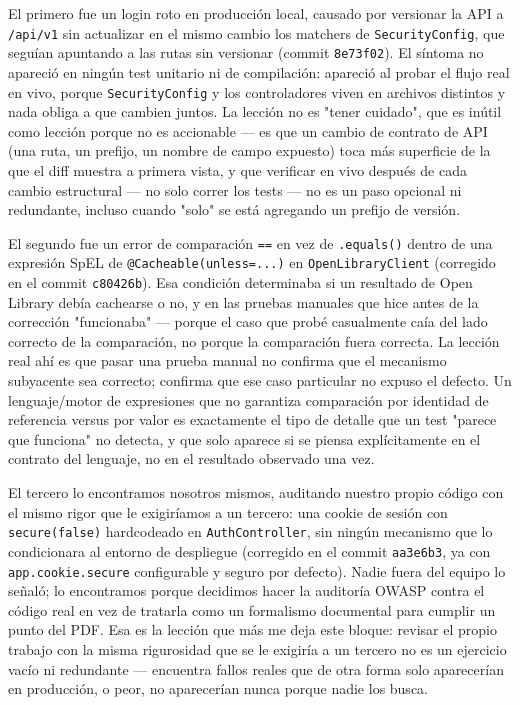 \documentclass[12pt,a4paper]{article}
\begin{document}
El primero fue un login roto en producción local, causado por versionar la API a
\texttt{/api/v1} sin actualizar en el mismo cambio los matchers de
\texttt{SecurityConfig}, que seguían apuntando a las rutas sin versionar (commit
\texttt{8e73f02}). El síntoma no apareció en ningún test unitario ni de compilación:
apareció al probar el flujo real en vivo, porque \texttt{SecurityConfig} y los
controladores viven en archivos distintos y nada obliga a que cambien juntos. La
lección no es "tener cuidado", que es inútil como lección porque no es accionable — es
que un cambio de contrato de API (una ruta, un prefijo, un nombre de campo expuesto)
toca más superficie de la que el diff muestra a primera vista, y que verificar en vivo
después de cada cambio estructural — no solo correr los tests — no es un paso opcional
ni redundante, incluso cuando "solo" se está agregando un prefijo de versión.

El segundo fue un error de comparación \texttt{==} en vez de \texttt{.equals()} dentro
de una expresión SpEL de \texttt{@Cacheable(unless=...)} en \texttt{OpenLibraryClient}
(corregido en el commit \texttt{c80426b}). Esa condición determinaba si un resultado de
Open Library debía cachearse o no, y en las pruebas manuales que hice antes de la
corrección "funcionaba" — porque el caso que probé casualmente caía del lado correcto
de la comparación, no porque la comparación fuera correcta. La lección real ahí es que
pasar una prueba manual no confirma que el mecanismo subyacente sea correcto; confirma
que ese caso particular no expuso el defecto. Un lenguaje/motor de expresiones que no
garantiza comparación por identidad de referencia versus por valor es exactamente el
tipo de detalle que un test "parece que funciona" no detecta, y que solo aparece si se
piensa explícitamente en el contrato del lenguaje, no en el resultado observado una vez.

El tercero lo encontramos nosotros mismos, auditando nuestro propio código con el mismo
rigor que le exigiríamos a un tercero: una cookie de sesión con \texttt{secure(false)}
hardcodeado en \texttt{AuthController}, sin ningún mecanismo que lo condicionara al
entorno de despliegue (corregido en el commit \texttt{aa3e6b3}, ya con
\texttt{app.cookie.secure} configurable y seguro por defecto). Nadie fuera del equipo lo
señaló; lo encontramos porque decidimos hacer la auditoría OWASP contra el código real
en vez de tratarla como un formalismo documental para cumplir un punto del PDF. Esa es
la lección que más me deja este bloque: revisar el propio trabajo con la misma
rigurosidad que se le exigiría a un tercero no es un ejercicio vacío ni redundante —
encuentra fallos reales que de otra forma solo aparecerían en producción, o peor, no
aparecerían nunca porque nadie los busca.
\end{document}
